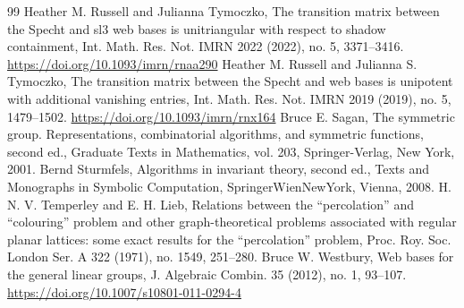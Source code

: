 \documentclass[10pt]{amsart}
\theoremstyle{definition}
\theoremstyle{plain}
\theoremstyle{plain}
\theoremstyle{definition}
\theoremstyle{remark}
\theoremstyle{plain}
\theoremstyle{plain}
\theoremstyle{plain}
\numberwithin{equation}{section}
\begin{document}
\begin{thebibliography}{99}
 Heather M. Russell and Julianna Tymoczko, The transition matrix between the Specht and sl3 web bases is unitriangular with respect to shadow containment, Int. Math. Res. Not. IMRN 2022 (2022), no. 5, 3371–3416. \url{https://doi.org/10.1093/imrn/rnaa290}
 Heather M. Russell and Julianna S. Tymoczko, The transition matrix between the Specht and web bases is unipotent with additional vanishing entries, Int. Math. Res. Not. IMRN 2019 (2019), no. 5, 1479–1502. \url{https://doi.org/10.1093/imrn/rnx164}
 Bruce E. Sagan, The symmetric group. Representations, combinatorial algorithms, and symmetric functions, second ed., Graduate Texts in Mathematics, vol. 203, Springer-Verlag, New York, 2001. 
 Bernd Sturmfels, Algorithms in invariant theory, second ed., Texts and Monographs in Symbolic Computation, SpringerWienNewYork, Vienna, 2008. 
 H. N. V. Temperley and E. H. Lieb, Relations between the “percolation” and “colouring” problem and other graph-theoretical problems associated with regular planar lattices: some exact results for the “percolation” problem, Proc. Roy. Soc. London Ser. A 322 (1971), no. 1549, 251–280. 
 Bruce W. Westbury, Web bases for the general linear groups, J. Algebraic Combin. 35 (2012), no. 1, 93–107. \url{https://doi.org/10.1007/s10801-011-0294-4}
\end{thebibliography}
\end{document}
